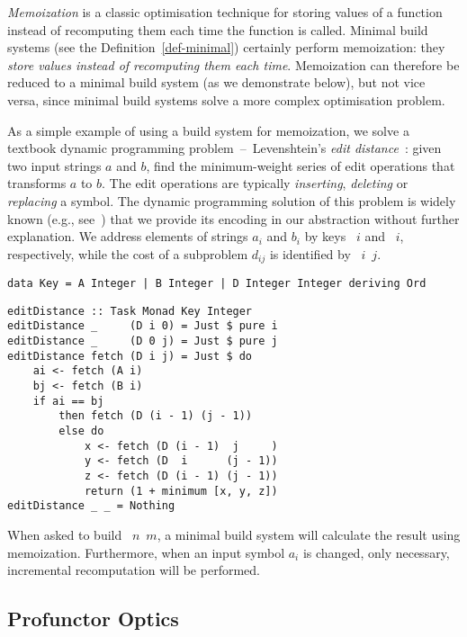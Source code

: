 \emph{Memoization} is a classic optimisation technique for storing values of a
function instead of recomputing them each time the function is called. Minimal
build systems (see the Definition~\ref{def-minimal}) certainly perform
memoization: they \emph{store values instead of recomputing them each time}.
Memoization can therefore be reduced to a minimal build system (as we
demonstrate below), but not vice versa, since minimal build systems solve a more
complex optimisation problem.

As a simple example of using a build system for memoization, we solve a textbook
dynamic programming problem~--~Levenshtein's \emph{edit
distance}~\cite{levenshtein1966binary}: given two input strings $a$ and
$b$, find the minimum-weight series of edit operations that transforms $a$
to $b$. The edit operations are typically \emph{inserting}, \emph{deleting} or
\emph{replacing} a symbol. The dynamic programming solution of this problem is
widely known (e.g., see~\cite{cormen2001introduction}) that we provide its
encoding in our  abstraction without further explanation.
We address elements of strings $a_i$ and $b_i$ by keys ~$i$ and ~$i$,
respectively, while the cost of a subproblem $d_{ij}$ is identified by
~$i$~$j$.

\begin{verbatim}
data Key = A Integer | B Integer | D Integer Integer deriving Ord
\end{verbatim}
\vspace{1mm}
\begin{verbatim}
editDistance :: Task Monad Key Integer
editDistance _     (D i 0) = Just $ pure i
editDistance _     (D 0 j) = Just $ pure j
editDistance fetch (D i j) = Just $ do
    ai <- fetch (A i)
    bj <- fetch (B i)
    if ai == bj
        then fetch (D (i - 1) (j - 1))
        else do
            x <- fetch (D (i - 1)  j     )
            y <- fetch (D  i      (j - 1))
            z <- fetch (D (i - 1) (j - 1))
            return (1 + minimum [x, y, z])
editDistance _ _ = Nothing
\end{verbatim}

\noindent
When asked to build ~$n$~$m$, a minimal build system will calculate the
result using memoization. Furthermore, when an input symbol $a_i$ is changed,
only necessary, incremental recomputation will be performed.

\subsection{Profunctor Optics}\label{sec-related-optics}

